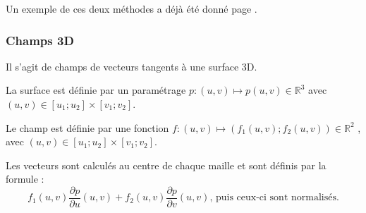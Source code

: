 Un exemple de ces deux méthodes a déjà été donné page \pageref{fields}.

\subsubsection{Champs 3D}

Il s'agit de champs de vecteurs tangents à une surface 3D.

La surface est définie par un paramétrage $p\colon(u,v) \mapsto p(u,v) \in \mathbb R^3$ avec $(u,v) \in [u_1;u_2]\times[v_1;v_2]$.

Le champ est définie par une fonction $f\colon(u,v) \mapsto (f_1(u,v);f_2(u,v)) \in \mathbb R^2$ , avec $(u,v) \in [u_1;u_2]\times[v_1;v_2]$. 

Les vecteurs sont calculés au centre de chaque maille et sont définis par la formule :
\[ f_1(u,v) \dfrac{\partial p}{\partial u}(u,v)+f_2(u,v)\dfrac{\partial p}{\partial v}(u,v)\text{, puis ceux-ci sont normalisés.}\]

